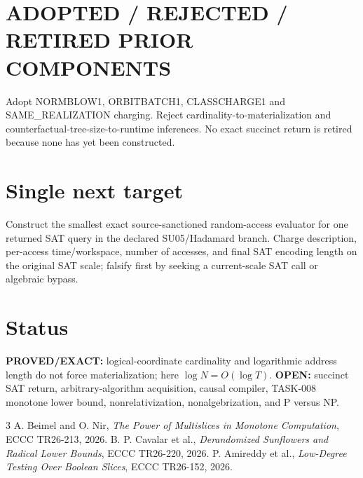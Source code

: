 \documentclass[11pt]{article}
\begin{document}
\section*{ADOPTED / REJECTED / RETIRED PRIOR COMPONENTS}
Adopt NORMBLOW1, ORBITBATCH1, CLASSCHARGE1 and SAME\_REALIZATION charging. Reject cardinality-to-materialization and counterfactual-tree-size-to-runtime inferences. No exact succinct return is retired because none has yet been constructed.

\section*{Single next target}
Construct the smallest exact source-sanctioned random-access evaluator for one returned SAT query in the declared SU05/Hadamard branch. Charge description, per-access time/workspace, number of accesses, and final SAT encoding length on the original SAT scale; falsify first by seeking a current-scale SAT call or algebraic bypass.

\section*{Status}
\textbf{PROVED/EXACT:} logical-coordinate cardinality and logarithmic address length do not force materialization; here \(\log N=O(\log T)\). \textbf{OPEN:} succinct SAT return, arbitrary-algorithm acquisition, causal compiler, TASK-008 monotone lower bound, nonrelativization, nonalgebrization, and P versus NP.
\begin{thebibliography}{3}
 A. Beimel and O. Nir, \emph{The Power of Multislices in Monotone Computation}, ECCC TR26-213, 2026.
 B. P. Cavalar et al., \emph{Derandomized Sunflowers and Radical Lower Bounds}, ECCC TR26-220, 2026.
 P. Amireddy et al., \emph{Low-Degree Testing Over Boolean Slices}, ECCC TR26-152, 2026.
\end{thebibliography}
\end{document}
